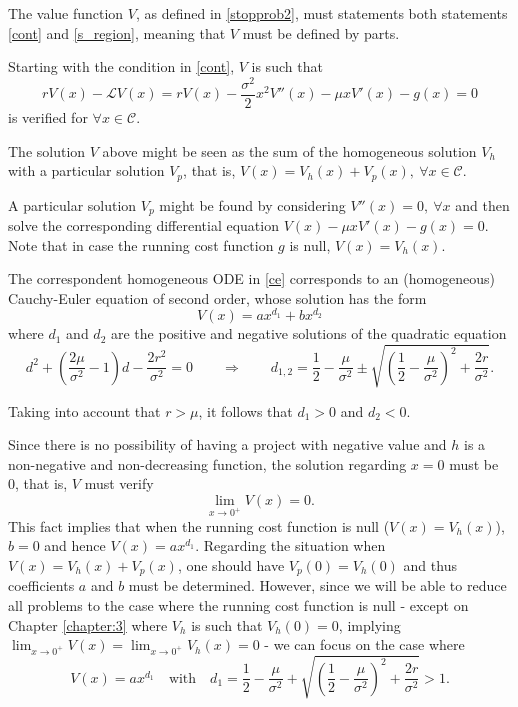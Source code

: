 The value function $V$, as defined in \eqref{stopprob2}, must statements both statements \eqref{cont} and \eqref{s_region}, meaning that $V$ must be defined by parts.

Starting with the condition in \eqref{cont}, $V$ is such that
\begin{equation}
r V(x) - \mathcal{L} V(x)= r V(x)-\frac{\sigma^2}{2}x^2V''(x)-\mu x V'(x) -g(x) =0
\label{ce}
\end{equation}
is verified for $\forall x \in \mathcal{C}$.

The solution $V$ above might be seen as the sum of the homogeneous solution $V_h$ with a particular solution $V_p$, that is, $V(x)=V_h(x)+V_p(x), \ \forall x \in \mathcal{C}$.

A particular solution $V_p$ might be found by considering $V''(x)=0, \ \forall x$ and then solve the corresponding differential equation $V(x)-\mu x V'(x) -g(x)=0$.
Note that in case the running cost function $g$ is null, $V(x)=V_h(x)$.

The correspondent homogeneous ODE in \eqref{ce} corresponds to an (homogeneous) Cauchy-Euler equation of second order, whose solution has the form
$$ V(x)=ax^{d_1}+bx^{d_2}$$
where $d_1$ and $d_2$ are the positive and negative solutions of the quadratic equation
\begin{equation}
d^2+\left( \frac{2 \mu}{\sigma^2}-1 \right)d-\frac{2r^2}{\sigma^2}=0 \qquad  \Rightarrow \qquad   d_{1,2}= \frac{1}{2}-\frac{\mu}{\sigma^2} \pm \sqrt{\left( \frac{1}{2} -\frac{\mu}{\sigma^2} \right) ^2+ \frac{2r}{\sigma^2}}.
\label{d1d2}
\end{equation}

Taking into account that $r>\mu$, it follows that $d_1>0$ and $d_2<0$.

Since there is no possibility of having a project with negative value and $h$ is a non-negative and non-decreasing function, the solution regarding $x=0$ must be 0, that is, $V$ must verify
\begin{equation}
\lim_{x\rightarrow 0^+} V(x)=0.
\label{cond1}
\end{equation}
This fact implies that when the running cost function is null ($V(x)=V_h(x)$), $b=0$ and hence $V(x)=ax^{d_1}$. Regarding the situation when $V(x)=V_h(x)+V_p(x)$, one should have $V_p(0)=V_h(0)$ and thus coefficients $a$ and $b$ must be determined. However, since we will be able to reduce all problems to the case where the running cost function is null - except on Chapter \ref{chapter:3} where $V_h$ is such that $V_h(0)=0$, implying $\lim_{x\rightarrow 0^+} V(x)=\lim_{x\rightarrow 0^+} V_h(x)=0$ - we can focus on the case where
\begin{equation}
V(x)=ax^{d_1} \quad \text{with} \quad d_1=\frac{1}{2}-\frac{\mu}{\sigma^2} +\sqrt{\left( \frac{1}{2} -\frac{\mu}{\sigma^2} \right) ^2+ \frac{2r}{\sigma^2}}>1.
\label{d1}
\end{equation}

